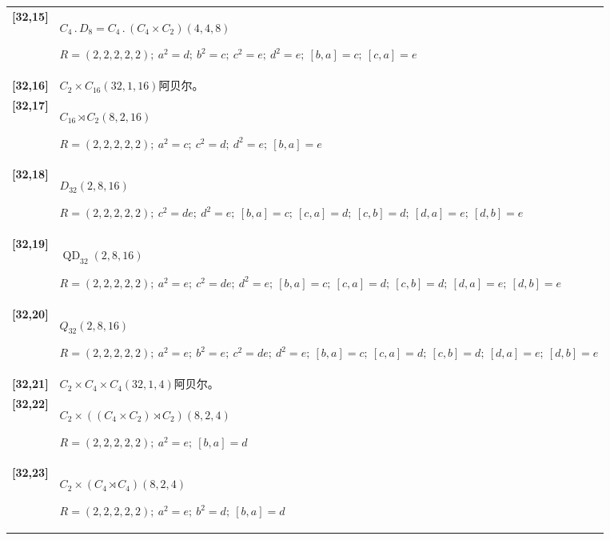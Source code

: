 \documentclass[UTF8,fontset=fandol,11pt,a4paper]{ctexart}
\begin{document}
\begin{longtable}{@{}p{17mm}>{\raggedright\arraybackslash}p{141mm}@{}}
\textbf{[32,15]} & $C_{4}\mathbin{.} D_{8} = C_{4}\mathbin{.} (C_{4}\times C_{2})$\quad $(4,4,8)$\par\(R=(2,2,2,2,2);\allowbreak\ a^{2}=d;\allowbreak\ b^{2}=c;\allowbreak\ c^{2}=e;\allowbreak\ d^{2}=e;\allowbreak\ [b,a]=c;\allowbreak\ [c,a]=e\)\\[3pt]

\textbf{[32,16]} & $C_{2}\times C_{16}$\quad $(32,1,16)$\quad 阿贝尔。\\[3pt]

\textbf{[32,17]} & $C_{16}\rtimes C_{2}$\quad $(8,2,16)$\par\(R=(2,2,2,2,2);\allowbreak\ a^{2}=c;\allowbreak\ c^{2}=d;\allowbreak\ d^{2}=e;\allowbreak\ [b,a]=e\)\\[3pt]

\textbf{[32,18]} & $D_{32}$\quad $(2,8,16)$\par\(R=(2,2,2,2,2);\allowbreak\ c^{2}=de;\allowbreak\ d^{2}=e;\allowbreak\ [b,a]=c;\allowbreak\ [c,a]=d;\allowbreak\ [c,b]=d;\allowbreak\ [d,a]=e;\allowbreak\ [d,b]=e\)\\[3pt]

\textbf{[32,19]} & $\operatorname{QD}_{32}$\quad $(2,8,16)$\par\(R=(2,2,2,2,2);\allowbreak\ a^{2}=e;\allowbreak\ c^{2}=de;\allowbreak\ d^{2}=e;\allowbreak\ [b,a]=c;\allowbreak\ [c,a]=d;\allowbreak\ [c,b]=d;\allowbreak\ [d,a]=e;\allowbreak\ [d,b]=e\)\\[3pt]

\textbf{[32,20]} & $Q_{32}$\quad $(2,8,16)$\par\(R=(2,2,2,2,2);\allowbreak\ a^{2}=e;\allowbreak\ b^{2}=e;\allowbreak\ c^{2}=de;\allowbreak\ d^{2}=e;\allowbreak\ [b,a]=c;\allowbreak\ [c,a]=d;\allowbreak\ [c,b]=d;\allowbreak\ [d,a]=e;\allowbreak\ [d,b]=e\)\\[3pt]

\textbf{[32,21]} & $C_{2}\times C_{4}\times C_{4}$\quad $(32,1,4)$\quad 阿贝尔。\\[3pt]

\textbf{[32,22]} & $C_{2}\times ((C_{4}\times C_{2})\rtimes C_{2})$\quad $(8,2,4)$\par\(R=(2,2,2,2,2);\allowbreak\ a^{2}=e;\allowbreak\ [b,a]=d\)\\[3pt]

\textbf{[32,23]} & $C_{2}\times (C_{4}\rtimes C_{4})$\quad $(8,2,4)$\par\(R=(2,2,2,2,2);\allowbreak\ a^{2}=e;\allowbreak\ b^{2}=d;\allowbreak\ [b,a]=d\)\\[3pt]


\end{longtable}
\end{document}
